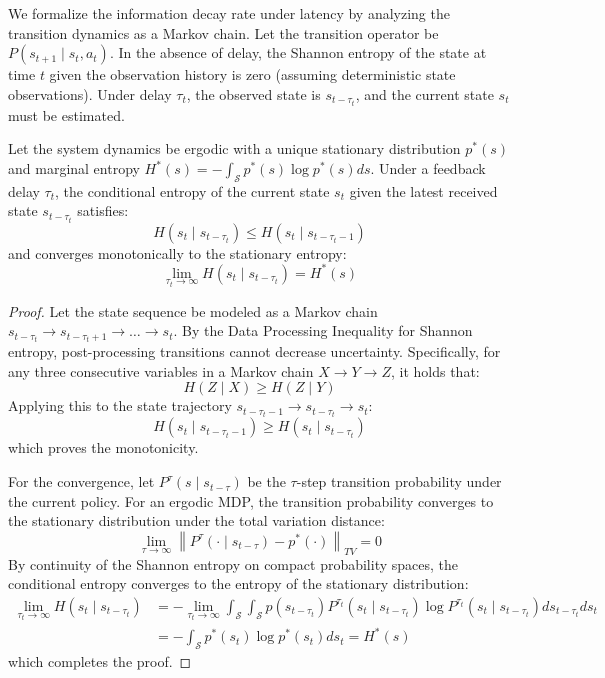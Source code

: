 \documentclass[manuscript, screen, review]{jair}
\begin{document}
We formalize the information decay rate under latency by analyzing the transition dynamics as a Markov chain. Let the transition operator be $P(s_{t+1} \mid s_t, a_t)$. In the absence of delay, the Shannon entropy of the state at time $t$ given the observation history is zero (assuming deterministic state observations). Under delay $\tau_t$, the observed state is $s_{t-\tau_t}$, and the current state $s_t$ must be estimated.

\begin{lemma}
Let the system dynamics be ergodic with a unique stationary distribution $p^*(s)$ and marginal entropy $H^*(s) = -\int_{\mathcal{S}} p^*(s) \log p^*(s) ds$. Under a feedback delay $\tau_t$, the conditional entropy of the current state $s_t$ given the latest received state $s_{t-\tau_t}$ satisfies:
\begin{equation}
    H(s_t \mid s_{t-\tau_t}) \le H(s_t \mid s_{t-\tau_t-1})
\end{equation}
and converges monotonically to the stationary entropy:
\begin{equation}
    \lim_{\tau_t \to \infty} H(s_t \mid s_{t-\tau_t}) = H^*(s)
\end{equation}
\end{lemma}

\begin{proof}
Let the state sequence be modeled as a Markov chain $s_{t-\tau_t} \to s_{t-\tau_t+1} \to \dots \to s_t$. By the Data Processing Inequality for Shannon entropy, post-processing transitions cannot decrease uncertainty. Specifically, for any three consecutive variables in a Markov chain $X \to Y \to Z$, it holds that:
\begin{equation*}
    H(Z \mid X) \ge H(Z \mid Y)
\end{equation*}
Applying this to the state trajectory $s_{t-\tau_t-1} \to s_{t-\tau_t} \to s_t$:
\begin{equation*}
    H(s_t \mid s_{t-\tau_t-1}) \ge H(s_t \mid s_{t-\tau_t})
\end{equation*}
which proves the monotonicity.

For the convergence, let $P^{\tau}(s \mid s_{t-\tau})$ be the $\tau$-step transition probability under the current policy. For an ergodic MDP, the transition probability converges to the stationary distribution under the total variation distance:
\begin{equation*}
    \lim_{\tau \to \infty} \left\| P^{\tau}(\cdot \mid s_{t-\tau}) - p^*(\cdot) \right\|_{TV} = 0
\end{equation*}
By continuity of the Shannon entropy on compact probability spaces, the conditional entropy converges to the entropy of the stationary distribution:
\begin{align*}
    \lim_{\tau_t \to \infty} H(s_t \mid s_{t-\tau_t}) &= -\lim_{\tau_t \to \infty} \int_{\mathcal{S}} \int_{\mathcal{S}} p(s_{t-\tau_t}) P^{\tau_t}(s_t \mid s_{t-\tau_t}) \log P^{\tau_t}(s_t \mid s_{t-\tau_t}) ds_{t-\tau_t} ds_t \\
    &= -\int_{\mathcal{S}} p^*(s_t) \log p^*(s_t) ds_t = H^*(s)
\end{align*}
which completes the proof.
\end{proof}
\end{document}
